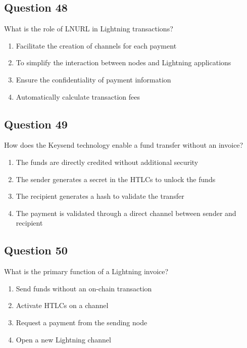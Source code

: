 \documentclass[12pt,a4paper]{article}
\begin{document}
\bigskip


\subsection*{Question 48}
What is the role of LNURL in Lightning transactions?

\begin{enumerate}[label=\Alph*., leftmargin=*]
\item Facilitate the creation of channels for each payment
\item To simplify the interaction between nodes and Lightning applications
\item Ensure the confidentiality of payment information
\item Automatically calculate transaction fees
\end{enumerate}

\bigskip


\subsection*{Question 49}
How does the Keysend technology enable a fund transfer without an invoice?

\begin{enumerate}[label=\Alph*., leftmargin=*]
\item The funds are directly credited without additional security
\item The sender generates a secret in the HTLCs to unlock the funds
\item The recipient generates a hash to validate the transfer
\item The payment is validated through a direct channel between sender and recipient
\end{enumerate}

\bigskip


\subsection*{Question 50}
What is the primary function of a Lightning invoice?

\begin{enumerate}[label=\Alph*., leftmargin=*]
\item Send funds without an on-chain transaction
\item Activate HTLCs on a channel
\item Request a payment from the sending node
\item Open a new Lightning channel
\end{enumerate}
\end{document}
